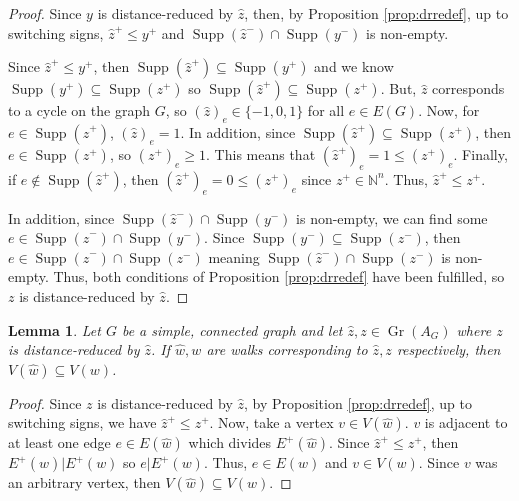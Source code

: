 \documentclass[a4paper, 12pt]{article}
\newcommand{\NN}{\mathbb N}
\theoremstyle{plain}
\newtheorem{lemma}[theorem]{Lemma}
\theoremstyle{definition}
\theoremstyle{remark}
\begin{document}
\begin{proof}
    Since $y$ is distance-reduced by $\hat z$, then, by Proposition \ref{prop:drredef}, up to switching signs, $\hat z^+ \le y^+$ and $\operatorname{Supp}(\hat z^-) \cap \operatorname{Supp}(y^-)$ is non-empty. 
    
    Since $\hat z^+ \le y^+$, then $\operatorname{Supp}(\hat z^+) \subseteq \operatorname{Supp}(y^+)$ and we know $\operatorname{Supp}(y^+) \subseteq \operatorname{Supp}(z^+)$ so $\operatorname{Supp}(\hat z^+) \subseteq \operatorname{Supp}(z^+)$. But, $\hat z$ corresponds to a cycle on the graph $G$, so $(\hat z)_e \in \{-1,0,1\}$ for all $e \in E(G)$. Now, for $e \in \operatorname{Supp}(\hat z^+)$, $(\hat z)_e=1$. In addition, since $\operatorname{Supp}(\hat z^+) \subseteq \operatorname{Supp}(z^+)$, then $e \in \operatorname{Supp}(z^+)$, so $(z^+)_e \ge 1$. This means that $(\hat z^+)_e=1 \le (z^+)_e$. Finally, if $e \not\in \operatorname{Supp}(\hat z^+)$, then $(\hat z^+)_e=0 \le (z^+)_e$ since $z^+ \in \NN^n$. Thus, $\hat z^+ \le z^+$. 
    
    In addition, since $\operatorname{Supp}(\hat z^-) \cap \operatorname{Supp}(y^-)$ is non-empty, we can find some $e \in \operatorname{Supp}(\hat z^-) \cap \operatorname{Supp}(y^-)$. Since $\operatorname{Supp}(y^-) \subseteq \operatorname{Supp}(z^-)$, then $e \in \operatorname{Supp}(\hat z^-) \cap \operatorname{Supp}(z^-)$ meaning $ \operatorname{Supp}(\hat z^-) \cap \operatorname{Supp}(z^-)$ is non-empty. Thus, both conditions of Proposition \ref{prop:drredef} have been fulfilled, so $z$ is distance-reduced by $\hat z$.
\end{proof}

\begin{lemma} \label{lem:vertexin}
    Let $G$ be a simple, connected graph and let $\hat z,z \in \operatorname{Gr}(A_G)$ where $z$ is distance-reduced by $\hat z$. If $\hat w,w$ are walks corresponding to $\hat z,z$ respectively, then $V(\hat w) \subseteq V(w)$.
\end{lemma}

\begin{proof}
    Since $z$ is distance-reduced by $\hat z$, by Proposition \ref{prop:drredef}, up to switching signs, we have $\hat z^+ \le z^+$. Now, take a vertex $v \in V(\hat w)$. $v$ is adjacent to at least one edge $e \in E(\hat w)$ which divides $E^+(\hat w)$. Since $\hat z^+ \le z^+$, then $E^+(\hat w) | E^+(w)$ so $e|E^+(w)$. Thus, $e \in E(w)$ and $v \in V(w)$. Since $v$ was an arbitrary vertex, then $V(\hat w) \subseteq V(w)$.
\end{proof}
\end{document}
